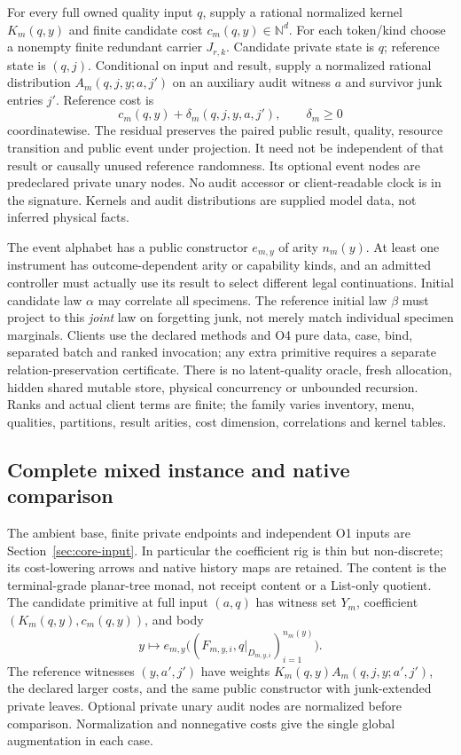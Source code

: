 \documentclass[11pt,a4paper]{article}
\theoremstyle{definition}
\begin{document}
For every full owned quality input $q$, supply a rational normalized
kernel $K_m(q,y)$ and finite candidate cost $c_m(q,y)\in\mathbb N^d$.
For each token/kind choose a nonempty finite redundant carrier $J_{r,k}$.
Candidate private state is $q$; reference state is $(q,j)$. Conditional
on input and result, supply a normalized rational distribution
$A_m(q,j,y;a,j')$ on an auxiliary audit witness $a$ and survivor junk
entries $j'$. Reference cost is
\[
c_m(q,y)+\delta_m(q,j,y,a,j'),\qquad \delta_m\geq0
\]
coordinatewise. The residual preserves the paired public result, quality, resource
transition and public event under projection. It need not be independent
of that result or causally unused reference randomness. Its optional event nodes are predeclared
private unary nodes. No audit accessor or client-readable clock is in
the signature. Kernels and audit distributions are supplied model data,
not inferred physical facts.

The event alphabet has a public constructor $e_{m,y}$ of arity $n_m(y)$.
At least one instrument has outcome-dependent arity or capability kinds,
and an admitted controller must actually use its result to select different
legal continuations. Initial candidate law $\alpha$ may correlate all
specimens. The reference initial law $\beta$ must project to this
\emph{joint} law on forgetting junk, not merely match individual
specimen marginals. Clients use the declared methods and O4 pure data,
case, bind, separated batch and ranked invocation; any extra primitive
requires a separate relation-preservation certificate. There is no
latent-quality oracle, fresh allocation, hidden shared mutable store,
physical concurrency or unbounded recursion. Ranks and actual client
terms are finite; the family varies inventory, menu, qualities, partitions,
result arities, cost dimension, correlations and kernel tables.

\subsection{Complete mixed instance and native comparison}
The ambient base, finite private endpoints and independent O1 inputs are
Section~\ref{sec:core-input}. In particular the coefficient rig is thin
but non-discrete; its cost-lowering arrows and native history maps are
retained. The content is the terminal-grade planar-tree monad, not receipt
content or a List-only quotient. The candidate primitive at full input
$(a,q)$ has witness set $Y_m$, coefficient $(K_m(q,y),c_m(q,y))$, and body
\begin{equation}\label{eq:A-body}
y\longmapsto e_{m,y}\bigl((F_{m,y,i},q|_{D_{m,y,i}})_{i=1}^{n_m(y)}\bigr).
\end{equation}
The reference witnesses $(y,a',j')$ have weights
$K_m(q,y)A_m(q,j,y;a',j')$, the declared larger costs, and the same
public constructor with junk-extended private leaves. Optional private
unary audit nodes are normalized before comparison. Normalization and
nonnegative costs give the single global augmentation in each case.
\end{document}
